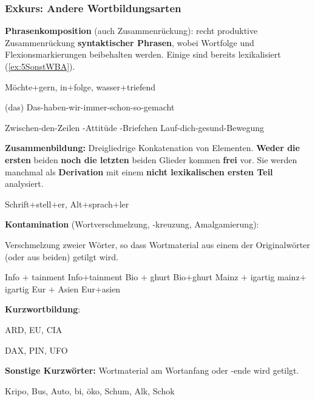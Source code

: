 \begin{frame}
\frametitle{Exkurs: Andere Wortbildungsarten}

\textbf{Phrasenkomposition} (auch Zusammenrückung): recht produktive Zusammenrückung \textbf{syntaktischer Phrasen}, wobei Wortfolge und Flexionsmarkierungen beibehalten werden. Einige sind bereits lexikalisiert (\ref{ex:5SonstWBA}).

\settowidth{} 	
\ea \label{ex:5SonstWBA} Möchte$+$gern, in$+$folge, wasser$+$triefend

\ex \label{ex:5PKomp0}
\ea (das) Das-haben-wir-immer-schon-so-gemacht

\ex Zwischen-den-Zeilen -Attitüde
\ex {}-Briefchen
\ex Lauf-dich-gesund-Bewegung 		
\z
\z


\medskip
\pause 


\textbf{Zusammenbildung:} Dreigliedrige Konkatenation von Elementen. \textbf{Weder die ersten} beiden \textbf{noch die letzten} beiden Glieder kommen \textbf{frei} vor. Sie werden manchmal als \textbf{Derivation} mit einem \textbf{nicht lexikalischen ersten Teil} analysiert.

\ea Schrift$+$stell$+$er, Alt$+$sprach$+$ler
\ex 
{}
\z 
\z


\end{frame}


\begin{frame}


\textbf{Kontamination} (Wortverschmelzung, -kreuzung, Amalgamierung):

Verschmelzung zweier Wörter, so dass Wortmaterial aus einem der Originalwörter (oder aus beiden) getilgt wird.

\ea 
\ea Info $+$ tainment \ras Info$+$tainment
\ex Bio $+$ ghurt \ras Bio$+$ghurt 
\ex Mainz $+$ igartig \ras mainz$+$igartig
\ex Eur $+$ Asien \ras Eur$+$asien
\z 
\z


\medskip
\pause 


\textbf{Kurzwortbildung}:

\settowidth{} 
\ea ARD, EU, CIA
\z

\ea DAX, PIN, UFO
\z


\medskip


\textbf{Sonstige Kurzwörter:} Wortmaterial am Wortanfang oder -ende wird getilgt.

\ea Kripo, Bus, Auto, bi, öko, Schum, Alk, Schok
\z

\end{frame}


